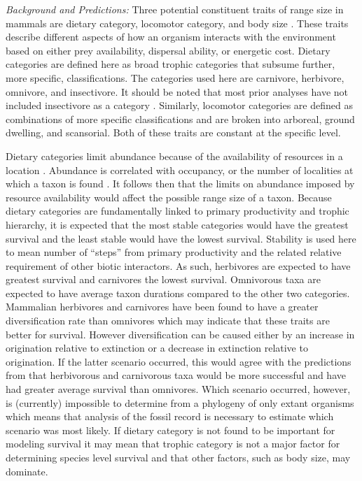 \documentclass[12pt,letterpaper]{article}
\begin{document}
\textit{Background and Predictions:} 
Three potential constituent traits of range size in mammals are dietary category, locomotor category, and body size \citep{Smith2004,Smith2008b,Damuth1981a,Damuth1979,Jernvall2004,Lyons2005,Lyons2010}. These traits describe different aspects of how an organism interacts with the environment based on either prey availability, dispersal ability, or energetic cost. Dietary categories are defined here as broad trophic categories that subsume further, more specific, classifications. The categories used here are carnivore, herbivore, omnivore, and insectivore. It should be noted that most prior analyses have not included insectivore as a category \citep{Jernvall2004,Price2012}. Similarly, locomotor categories are defined as combinations of more specific classifications and are broken into arboreal, ground dwelling, and scansorial. Both of these traits are constant at the specific level. 

Dietary categories limit abundance because of the availability of resources in a location \citep{VanValen1989,Brown1987,Damuth1979,Silva1997,Janis2000}. Abundance is correlated with occupancy, or the number of localities at which a taxon is found \citep{Jernvall2002,Fortelius2002,Brown1984}. It follows then that the limits on abundance imposed by resource availability would affect the possible range size of a taxon. Because dietary categories are fundamentally linked to primary productivity and trophic hierarchy, it is expected that the most stable categories would have the greatest survival and the least stable would have the lowest survival. Stability is used here to mean number of ``steps'' from primary productivity and the related relative requirement of other biotic interactors. As such, herbivores are expected to have greatest survival and carnivores the lowest survival. Omnivorous taxa are expected to have average taxon durations compared to the other two categories. Mammalian herbivores and carnivores have been found to have a greater diversification rate than omnivores \citep{Price2012} which may indicate that these traits are better for survival. However diversification can be caused either by an increase in origination relative to extinction or a decrease in extinction relative to origination. If the latter scenario occurred, this would agree with the predictions from \citet{Price2012} that herbivorous and carnivorous taxa would be more successful and have had greater average survival than omnivores. Which scenario occurred, however, is (currently) impossible to determine from a phylogeny of only extant organisms \citep{Rabosky2010a} which means that analysis of the fossil record is necessary to estimate which scenario was most likely. If dietary category is not found to be important for modeling survival it may mean that trophic category is not a major factor for determining species level survival and that other factors, such as body size, may dominate. 
\end{document}
